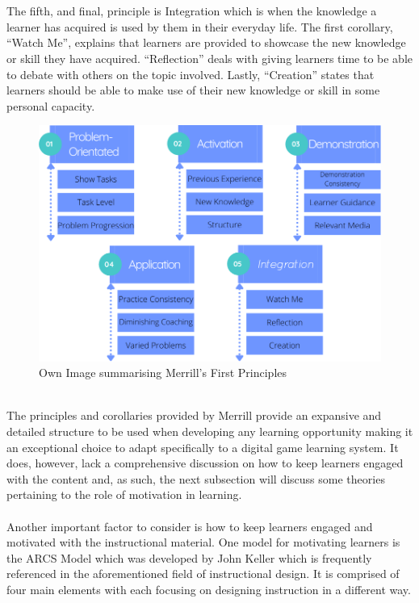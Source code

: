 \documentclass[conference]{IEEEtran}
\begin{document}
\\\\
The fifth, and final, principle is Integration which is when the knowledge a learner has acquired is used by them in their everyday life\cite{Merrill2002}. The first corollary, “Watch Me”, explains that learners are provided to showcase the new knowledge or skill they have acquired\cite{Merrill2002}. “Reflection” deals with giving learners time to be able to debate with others on the topic involved\cite{Merrill2002}. Lastly, “Creation” states that learners should be able to make use of their new knowledge or skill in some personal capacity\cite{Merrill2002}.
\\
\begin{figure}[htbp]
\centerline{\includegraphics[scale=0.35]{merrill2.png}}
\caption{Own Image summarising Merrill's First Principles}
\label{fig}
\end{figure}
\\
The principles and corollaries provided by Merrill\cite{Merrill2002} provide an expansive and detailed structure to be used when developing any learning opportunity making it an exceptional choice to adapt specifically to a digital game learning system.  It does, however, lack a comprehensive discussion on how to keep learners engaged with the content and, as such, the next subsection will discuss some theories pertaining to the role of motivation in learning.
\\\\
Another important factor to consider is how to keep learners engaged and motivated with the instructional material. One model for motivating learners is the ARCS Model which was developed by John Keller which is frequently referenced in the aforementioned field of instructional design\cite{Kapp2012a}. It is comprised of four main elements with each focusing on designing instruction in a different way\cite{Kapp2012a}. 
\end{document}
